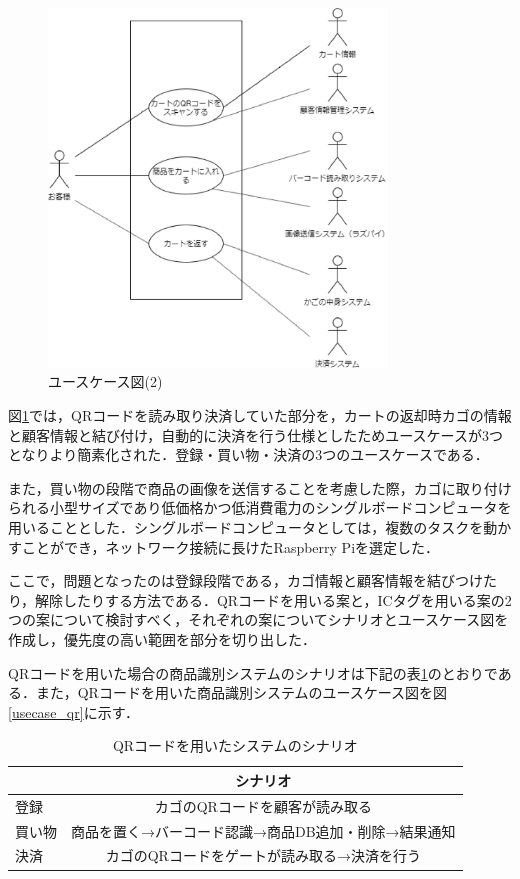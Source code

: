\begin{figure}[htbp]
\centering
\includegraphics[width = 9cm]{./picture/usecase3.eps}
\caption{ユースケース図(2)}
\label{usecase3}
\end{figure}


図\ref{usecase3}では，QRコードを読み取り決済していた部分を，カートの返却時カゴの情報と顧客情報と結び付け，自動的に決済を行う仕様としたためユースケースが3つとなりより簡素化された．登録・買い物・決済の3つのユースケースである．

また，買い物の段階で商品の画像を送信することを考慮した際，カゴに取り付けられる小型サイズであり低価格かつ低消費電力のシングルボードコンピュータを用いることとした．シングルボードコンピュータとしては，複数のタスクを動かすことができ，ネットワーク接続に長けたRaspberry Piを選定した．

ここで，問題となったのは登録段階である，カゴ情報と顧客情報を結びつけたり，解除したりする方法である．QRコードを用いる案と，ICタグを用いる案の2つの案について検討すべく，それぞれの案についてシナリオとユースケース図を作成し，優先度の高い範囲を部分を切り出した．


QRコードを用いた場合の商品識別システムのシナリオは下記の表\ref{sina_qr}のとおりである．また，QRコードを用いた商品識別システムのユースケース図を図\ref{usecase_qr}に示す．


\begin{table}[htb]
\begin{center}
\caption{QRコードを用いたシステムのシナリオ}
\begin{tabular}{|l|c|} \hline
 & シナリオ \\ \hline \hline
登録 & カゴのQRコードを顧客が読み取る \\
買い物 & 商品を置く→バーコード認識→商品DB追加・削除→結果通知 \\
決済 & カゴのQRコードをゲートが読み取る→決済を行う \\ \hline
\end{tabular}
\label{sina_qr}
\end{center}
\end{table}


